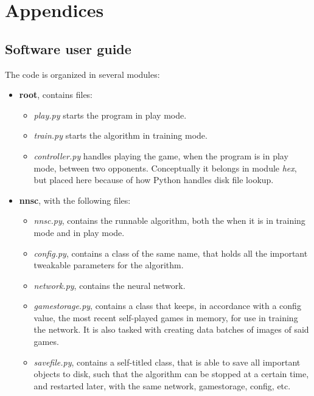 \appendix
{}
\renewcommand\thefigure{\thesection.\arabic{figure}}

\chapter*{Appendices}
\renewcommand{\thesection}{\Alph{section}}

\section{Software user guide}
The code is organized in several modules:
\begin{itemize}
	\itemsep-0.3em 
	\item \textbf{root}, contains files:
	\begin{itemize}
		\itemsep-0.3em 
		\item \textit{play.py} starts the program in play mode. 
		\item \textit{train.py} starts the algorithm in training mode.
		\item \textit{controller.py} handles playing the game, when the program is in play mode, between two opponents. Conceptually it belongs in module \textit{hex}, but placed here because of how Python handles disk file lookup.
	\end{itemize}
	\item \textbf{nnsc}, with the following files:
	\begin{itemize}
		\itemsep-0.3em 
		\item \textit{nnsc.py}, contains the runnable algorithm, both the when it is in training mode and in play mode.
		\item \textit{config.py}, contains a class of the same name, that holds all the important tweakable parameters for the algorithm. 
		\item \textit{network.py}, contains the neural network.
		\item \textit{gamestorage.py}, contains a class that keeps, in accordance with a config value, the most recent self-played games in memory, for use in training the network. It is also tasked with creating data batches of images of said games.
		\item \textit{savefile.py}, contains a self-titled class, that is able to save all important objects to disk, such that the algorithm can be stopped at a certain time, and restarted later, with the same network, gamestorage, config, etc.
	\end{itemize}

\end{itemize}
